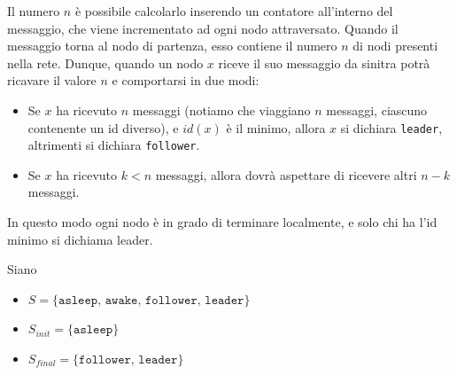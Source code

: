 Il numero $n$ è possibile calcolarlo inserendo un contatore all'interno del messaggio, che viene incrementato ad ogni nodo attraversato. Quando il messaggio torna al nodo di partenza, esso contiene il numero $n$ di nodi presenti nella rete. Dunque, quando un nodo $x$ riceve il suo messaggio da sinitra potrà ricavare il valore $n$ e comportarsi in due modi:
\begin{itemize}
    \item Se $x$ ha ricevuto $n$ messaggi (notiamo che viaggiano $n$ messaggi, ciascuno contenente un id diverso), e $id(x)$ è il minimo, allora $x$ si dichiara \texttt{leader}, altrimenti si dichiara \texttt{follower}.
    \item Se $x$ ha ricevuto $k < n$ messaggi, allora dovrà aspettare di ricevere altri $n - k$ messaggi.
\end{itemize}

In questo modo ogni nodo è in grado di terminare localmente, e solo chi ha l'id minimo si dichiama leader.

Siano
\begin{itemize}
    \item $S = \{\texttt{asleep, awake, follower, leader}\}$
    \item $S_{init} = \{\texttt{asleep}\}$
    \item $S_{final} = \{\texttt{follower, leader}\}$
\end{itemize}

